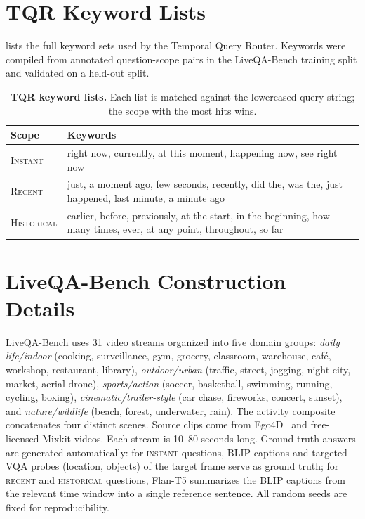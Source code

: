 \clearpage
\setcounter{page}{1}
\maketitlesupplementary

\section{TQR Keyword Lists}
\label{sec:suppl_tqr}

 lists the full keyword sets used by the Temporal Query Router. Keywords were compiled from annotated question-scope pairs in the LiveQA-Bench training split and validated on a held-out split.

\begin{table}[h]
  \caption{\textbf{TQR keyword lists.} Each list is matched against the lowercased query string; the scope with the most hits wins.}
  \label{tab:tqr_keywords}
  \centering
  \small
  \begin{tabular}{@{}lp{5.8cm}@{}}
    \toprule
    Scope & Keywords \\
    \midrule
    \textsc{Instant} & right now, currently, at this moment, happening now, see right now \\[3pt]
    \textsc{Recent} & just, a moment ago, few seconds, recently, did the, was the, just happened, last minute, a minute ago \\[3pt]
    \textsc{Historical} & earlier, before, previously, at the start, in the beginning, how many times, ever, at any point, throughout, so far \\
    \bottomrule
  \end{tabular}
\end{table}

\section{LiveQA-Bench Construction Details}
\label{sec:suppl_liveqa}

LiveQA-Bench uses 31 video streams organized into five domain groups:
\emph{daily life/indoor} (cooking, surveillance, gym, grocery, classroom, warehouse, caf\'{e}, workshop, restaurant, library),
\emph{outdoor/urban} (traffic, street, jogging, night city, market, aerial drone),
\emph{sports/action} (soccer, basketball, swimming, running, cycling, boxing),
\emph{cinematic/trailer-style} (car chase, fireworks, concert, sunset), and
\emph{nature/wildlife} (beach, forest, underwater, rain).
The activity composite concatenates four distinct scenes.
Source clips come from Ego4D~\cite{grauman2022ego4d} and free-licensed Mixkit videos.
Each stream is 10--80 seconds long.
Ground-truth answers are generated automatically: for \textsc{instant} questions, BLIP captions and targeted VQA probes (location, objects) of the target frame serve as ground truth; for \textsc{recent} and \textsc{historical} questions, Flan-T5 summarizes the BLIP captions from the relevant time window into a single reference sentence.
All random seeds are fixed for reproducibility.

